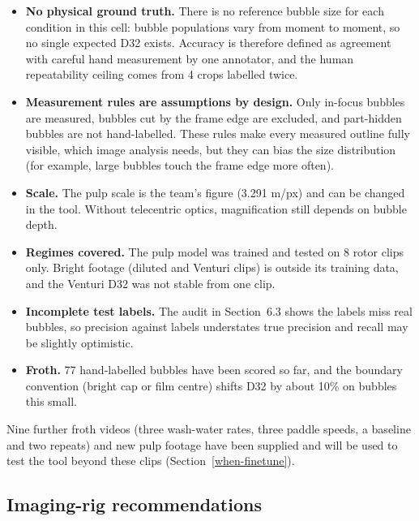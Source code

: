 \begin{itemize}
\tightlist
\item
  \textbf{No physical ground truth.} There is no reference bubble size
  for each condition in this cell: bubble populations vary from moment
  to moment, so no single expected D32 exists. Accuracy is therefore
  defined as agreement with careful hand measurement by one annotator,
  and the human repeatability ceiling comes from 4 crops labelled twice.
\item
  \textbf{Measurement rules are assumptions by design.} Only in-focus
  bubbles are measured, bubbles cut by the frame edge are excluded, and
  part-hidden bubbles are not hand-labelled. These rules make every
  measured outline fully visible, which image analysis needs, but they
  can bias the size distribution (for example, large bubbles touch the
  frame edge more often).
\item
  \textbf{Scale.} The pulp scale is the team's figure (3.291 \textmu m/px)
  and can be changed in the tool. Without telecentric optics,
  magnification still depends on bubble depth.
\item
  \textbf{Regimes covered.} The pulp model was trained and tested on 8
  rotor clips only. Bright footage (diluted and Venturi clips) is outside
  its training data, and the Venturi D32 was not stable from one clip.
\item
  \textbf{Incomplete test labels.} The audit in Section~6.3 shows the
  labels miss real bubbles, so precision against labels understates true
  precision and recall may be slightly optimistic.
\item
  \textbf{Froth.} 77 hand-labelled bubbles have been scored so far, and
  the boundary convention (bright cap or film centre) shifts D32 by about
  10\% on bubbles this small.
\end{itemize}

Nine further froth videos (three wash-water rates, three paddle speeds,
a baseline and two repeats) and new pulp footage have been supplied and
will be used to test the tool beyond these clips (Section~\ref{when-finetune}).

\hypertarget{imaging-rig-recommendations}{%
\subsection{Imaging-rig
recommendations}\label{imaging-rig-recommendations}}

